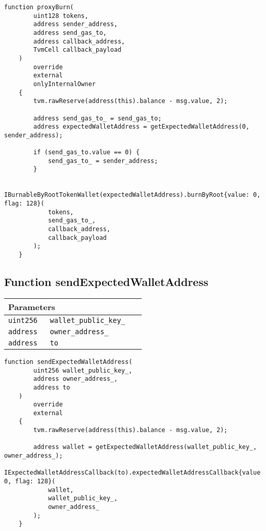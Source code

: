 \vspace{2cm}

\begin{lstlisting}[firstnumber=307]
    function proxyBurn(
        uint128 tokens,
        address sender_address,
        address send_gas_to,
        address callback_address,
        TvmCell callback_payload
    )
        override
        external
        onlyInternalOwner
    {
        tvm.rawReserve(address(this).balance - msg.value, 2);

        address send_gas_to_ = send_gas_to;
        address expectedWalletAddress = getExpectedWalletAddress(0, sender_address);

        if (send_gas_to.value == 0) {
            send_gas_to_ = sender_address;
        }

        IBurnableByRootTokenWallet(expectedWalletAddress).burnByRoot{value: 0, flag: 128}(
            tokens,
            send_gas_to_,
            callback_address,
            callback_payload
        );
    }
\end{lstlisting}

\subsection{Function sendExpectedWalletAddress}


\ifsoltables
\noindent\begin{tabular}{|l|l|p{5cm}|}\hline
\multicolumn{3}{|l|}{\bf Parameters}\\\hline
\tt uint256 & \tt wallet\_{}public\_{}key\_{} &\\\hline
\tt address & \tt owner\_{}address\_{} &\\\hline
\tt address & \tt to &\\\hline
\end{tabular}
\fi

\vspace{2cm}

\begin{lstlisting}[firstnumber=134]
    function sendExpectedWalletAddress(
        uint256 wallet_public_key_,
        address owner_address_,
        address to
    )
        override
        external
    {
        tvm.rawReserve(address(this).balance - msg.value, 2);

        address wallet = getExpectedWalletAddress(wallet_public_key_, owner_address_);
        IExpectedWalletAddressCallback(to).expectedWalletAddressCallback{value: 0, flag: 128}(
            wallet,
            wallet_public_key_,
            owner_address_
        );
    }
\end{lstlisting}


